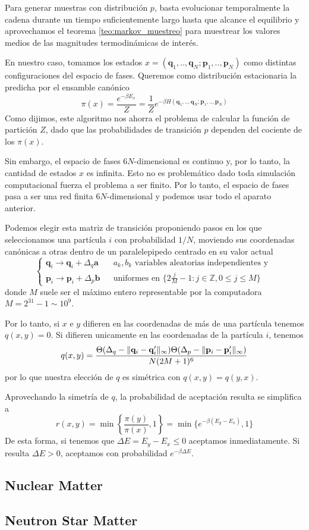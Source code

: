 Para generar muestras con distribución $p$, basta evolucionar temporalmente la cadena durante un tiempo suficientemente largo hasta que alcance el equilibrio y 
aprovechamos el teorema \ref{teo:markov_muestreo} para muestrear los valores medios de las magnitudes termodinámicas de interés.

En nuestro caso, tomamos los estados $x = (\mathbf{q}_1,..,\mathbf{q}_N;\mathbf{p}_1,..,\mathbf{p}_N)$ como distintas configuraciones del espacio de fases.
Queremos como distribución estacionaria la predicha por el ensamble canónico \[\pi(x) = \frac{e^{-\beta E_x}}{Z} = \frac{1}{Z}e^{-\beta H(\mathbf{q}_1,..,\mathbf{q}_N;\mathbf{p}_1,..,\mathbf{p}_N)}\]
Como dijimos, este algoritmo nos ahorra el problema de calcular la función de partición $Z$, dado que las probabilidades de transición $p$ dependen del cociente de los $\pi(x)$.

Sin embargo, el espacio de fases $6N$-dimensional es continuo y, por lo tanto, la cantidad de estados $x$ es infinita.
Esto no es problemático dado toda simulación computacional fuerza el problema a ser finito.
Por lo tanto, el espacio de fases pasa a ser una red finita $6N$-dimensional y podemos usar todo el aparato anterior. 

Podemos elegir esta matriz de transición proponiendo pasos en los que seleccionamos una partícula $i$ con probabilidad $1/N$, moviendo sus coordenadas canónicas a otras dentro de un paralelepipedo 
centrado en su valor actual
\[
\left\{\begin{matrix}
\mathbf{q}_i \to  \mathbf{q}_i + \Delta_q \mathbf{a} & & a_k,b_k \text{ variables aleatorias independientes y }  \\ 
\mathbf{p}_i \to  \mathbf{p}_i + \Delta_p \mathbf{b} & &  \text{uniformes en } \{2\frac{j}{M}-1: j\in\mathbb{Z}, 0 \leq j \leq M\}
\end{matrix}\right.\]
donde $M$ suele ser el máximo entero representable por la computadora $M = 2^{31}-1\sim 10^9$. 

Por lo tanto, si $x$ e $y$ difieren en las coordenadas de más de una partícula tenemos $q(x,y)=0$. 
Si difieren unicamente en las coordenadas de la partícula $i$, tenemos 
\[q(x,y) = \frac{\Theta(\Delta_q - \Arrowvert \mathbf{q}_i - \mathbf{q}_i' \Arrowvert_\infty)\Theta(\Delta_p - \Arrowvert \mathbf{p}_i - \mathbf{p}_i' \Arrowvert_\infty)}{N(2M+1)^6}\]
por lo que nuestra elección de $q$ es simétrica con $q(x,y) = q(y,x)$.

Aprovechando la simetría de $q$, la probabilidad de aceptación resulta se simplifica a
\[r(x,y) = \min\left\{\frac{\pi(y)}{\pi(x)}, 1\right\} = \min\{e^{-\beta(E_y-E_x)}, 1\}\] 
De esta forma, si tenemos que $\Delta E = E_y - E_x \leq 0$ aceptamos inmediatamente. Si resulta $\Delta E > 0$, aceptamos con probabilidad $e^{-\beta\Delta E}$.


\subsection{Nuclear Matter}

\subsection{Neutron Star Matter}
